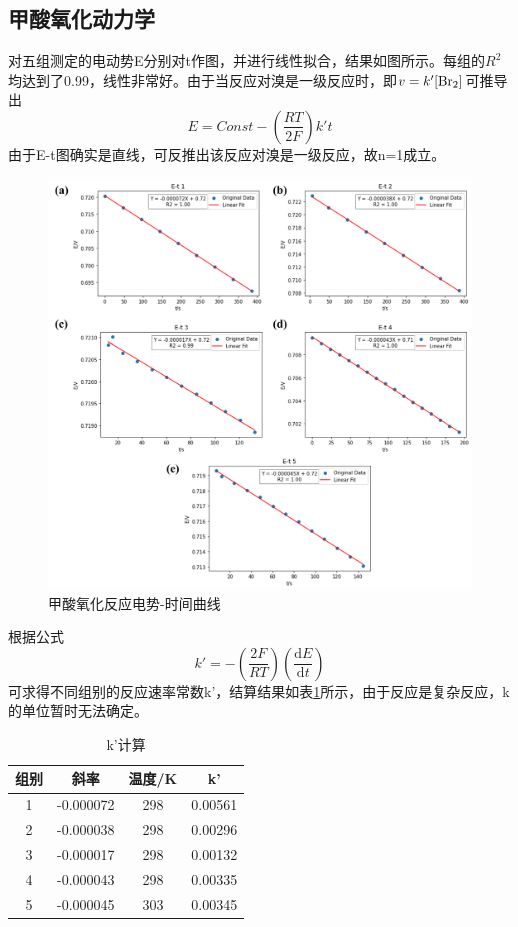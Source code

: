 \documentclass[12pt,hyperref,a4paper,UTF8]{ctexart}
\begin{document}
\subsection{甲酸氧化动力学}
对五组测定的电动势E分别对t作图，并进行线性拟合，结果如图所示。每组的$R^2$均达到了0.99，线性非常好。由于当反应对溴是一级反应时，即$v=k'[\ce{Br2}]$可推导出
$$
E=Const-(\frac{RT}{2F})k't
$$
由于E-t图确实是直线，可反推出该反应对溴是一级反应，故n=1成立。
\begin{figure}[H]
	\centering
	\includegraphics[width = .9\textwidth]{figures/regression3.png}
	\caption{甲酸氧化反应电势-时间曲线}
	\label{fig:BZcurve}
\end{figure}

根据公式
$$
k'=-(\frac{2F}{RT})(\frac{\mathrm{d}E}{\mathrm{d}t})
$$
可求得不同组别的反应速率常数k'，结算结果如表\ref{tab:kcal}所示，由于反应是复杂反应，k的单位暂时无法确定。
\begin{table}[H]
	\centering
	\caption{k'计算}
	\label{tab:kcal}
	\begin{tabular}{cccc}
		\hline
		组别 & 斜率        & 温度/K & k'       \\
		\hline
		1  & -0.000072 & 298  & 0.00561 \\
		2  & -0.000038 & 298  & 0.00296  \\
		3  & -0.000017 & 298  & 0.00132 \\
		4  & -0.000043 & 298  & 0.00335  \\
		5  & -0.000045 & 303  & 0.00345 \\
		\hline
	\end{tabular}
\end{table}
\end{document}
